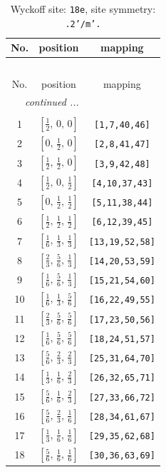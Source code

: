 \documentclass[fleqn,8pt]{jsarticle}
\begin{document}
\renewcommand{\arraystretch}{1.2}
\begin{longtable}{ccc}
\caption{Wyckoff site: {\tt 18e}, site symmetry: {\tt .2'/m'.}}
 \\
 \hline \hline
No. & position & mapping \\ \hline \endfirsthead

\multicolumn{2}{l}{\tablename\ \thetable{}} \\
 \hline \hline
No. & position & mapping \\ \hline \endhead

 \hline \hline
\multicolumn{2}{r}{\footnotesize\it continued ...} \\ \endfoot

 \hline \hline
\multicolumn{2}{r}{} \\ \endlastfoot

1 & $\left[ \frac{1}{2},\, 0,\, 0 \right]$ & {\tt [1,7,40,46]} \\ \hline
2 & $\left[ 0,\, \frac{1}{2},\, 0 \right]$ & {\tt [2,8,41,47]} \\ \hline
3 & $\left[ \frac{1}{2},\, \frac{1}{2},\, 0 \right]$ & {\tt [3,9,42,48]} \\ \hline
4 & $\left[ \frac{1}{2},\, 0,\, \frac{1}{2} \right]$ & {\tt [4,10,37,43]} \\ \hline
5 & $\left[ 0,\, \frac{1}{2},\, \frac{1}{2} \right]$ & {\tt [5,11,38,44]} \\ \hline
6 & $\left[ \frac{1}{2},\, \frac{1}{2},\, \frac{1}{2} \right]$ & {\tt [6,12,39,45]} \\ \hline
7 & $\left[ \frac{1}{6},\, \frac{1}{3},\, \frac{1}{3} \right]$ & {\tt [13,19,52,58]} \\ \hline
8 & $\left[ \frac{2}{3},\, \frac{5}{6},\, \frac{1}{3} \right]$ & {\tt [14,20,53,59]} \\ \hline
9 & $\left[ \frac{1}{6},\, \frac{5}{6},\, \frac{1}{3} \right]$ & {\tt [15,21,54,60]} \\ \hline
10 & $\left[ \frac{1}{6},\, \frac{1}{3},\, \frac{5}{6} \right]$ & {\tt [16,22,49,55]} \\ \hline
11 & $\left[ \frac{2}{3},\, \frac{5}{6},\, \frac{5}{6} \right]$ & {\tt [17,23,50,56]} \\ \hline
12 & $\left[ \frac{1}{6},\, \frac{5}{6},\, \frac{5}{6} \right]$ & {\tt [18,24,51,57]} \\ \hline
13 & $\left[ \frac{5}{6},\, \frac{2}{3},\, \frac{2}{3} \right]$ & {\tt [25,31,64,70]} \\ \hline
14 & $\left[ \frac{1}{3},\, \frac{1}{6},\, \frac{2}{3} \right]$ & {\tt [26,32,65,71]} \\ \hline
15 & $\left[ \frac{5}{6},\, \frac{1}{6},\, \frac{2}{3} \right]$ & {\tt [27,33,66,72]} \\ \hline
16 & $\left[ \frac{5}{6},\, \frac{2}{3},\, \frac{1}{6} \right]$ & {\tt [28,34,61,67]} \\ \hline
17 & $\left[ \frac{1}{3},\, \frac{1}{6},\, \frac{1}{6} \right]$ & {\tt [29,35,62,68]} \\ \hline
18 & $\left[ \frac{5}{6},\, \frac{1}{6},\, \frac{1}{6} \right]$ & {\tt [30,36,63,69]} \\
\end{longtable}
\end{document}
